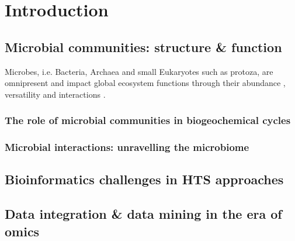\chapter{Introduction}
\label{cha:intro}


\section{Microbial communities: structure \& function}

Microbes, i.e. Bacteria, Archaea and small Eukaryotes such as protoza, are omnipresent and impact global ecosystem functions \citep{falkowski2008microbial} through their abundance \citep{bar2018biomass}, versatility \citep{rees2017improving} and interactions \citep{rottjers2018hairballs}. 





\subsection{The role of microbial communities in biogeochemical cycles}


\subsection{Microbial interactions: unravelling the microbiome}




\section{Bioinformatics challenges in HTS approaches}



\section{Data integration \& data mining in the era of omics}


